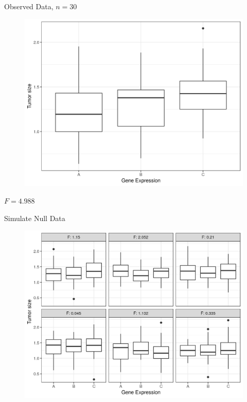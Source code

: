 \documentclass{beamer}
\begin{document}
\begin{frame}{Observed Data, $n=30$}
\begin{figure}
  \includegraphics[scale=0.5]{simulation/observed-plot}
\end{figure}
\centering
$F = 4.988$
\end{frame}


\begin{frame}{Simulate Null Data}
\pause
\begin{figure}
  \includegraphics[scale=0.60]{simulation/null-plots}
\end{figure}
\end{frame}
\end{document}
